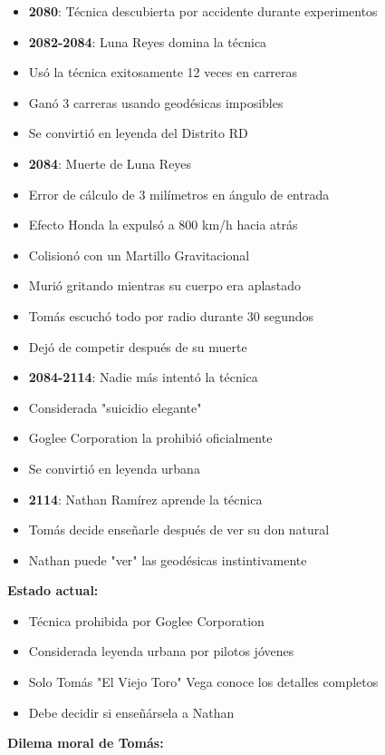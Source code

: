 \documentclass[11pt,a4paper]{report}
\begin{document}
\begin{itemize}
  \item \textbf{2080}: Técnica descubierta por accidente durante experimentos
  \item \textbf{2082-2084}: Luna Reyes domina la técnica
  \item Usó la técnica exitosamente 12 veces en carreras
  \item Ganó 3 carreras usando geodésicas imposibles
  \item Se convirtió en leyenda del Distrito RD
  \item \textbf{2084}: Muerte de Luna Reyes
  \item Error de cálculo de 3 milímetros en ángulo de entrada
  \item Efecto Honda la expulsó a 800 km/h hacia atrás
  \item Colisionó con un Martillo Gravitacional
  \item Murió gritando mientras su cuerpo era aplastado
  \item Tomás escuchó todo por radio durante 30 segundos
  \item Dejó de competir después de su muerte
  \item \textbf{2084-2114}: Nadie más intentó la técnica
  \item Considerada "suicidio elegante"
  \item Goglee Corporation la prohibió oficialmente
  \item Se convirtió en leyenda urbana
  \item \textbf{2114}: Nathan Ramírez aprende la técnica
  \item Tomás decide enseñarle después de ver su don natural
  \item Nathan puede "ver" las geodésicas instintivamente

\end{itemize}
\textbf{Estado actual:}

\begin{itemize}
  \item Técnica prohibida por Goglee Corporation
  \item Considerada leyenda urbana por pilotos jóvenes
  \item Solo Tomás "El Viejo Toro" Vega conoce los detalles completos
  \item Debe decidir si enseñársela a Nathan

\end{itemize}
\textbf{Dilema moral de Tomás:}
\end{document}
